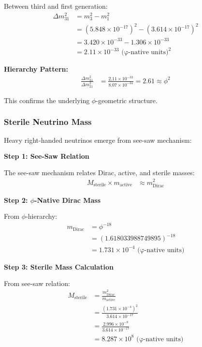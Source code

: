 Between third and first generation:
\begin{align}
\Delta m_{31}^2 &= m_3^2 - m_1^2 \\
&= (5.848 \times 10^{-17})^2 - (3.614 \times 10^{-17})^2 \\
&= 3.420 \times 10^{-33} - 1.306 \times 10^{-33} \\
&= 2.11 \times 10^{-33} \text{ (φ-native units)}^2
\end{align}

\textbf{Hierarchy Pattern:}
\begin{align}
\frac{\Delta m_{31}^2}{\Delta m_{21}^2} &= \frac{2.11 \times 10^{-33}}{8.07 \times 10^{-34}} = 2.61 \approx \phi^2
\end{align}

This confirms the underlying $\phi$-geometric structure.

\subsubsection{Sterile Neutrino Mass}

Heavy right-handed neutrinos emerge from see-saw mechanism:

\textbf{Step 1: See-Saw Relation}

The see-saw mechanism relates Dirac, active, and sterile masses:
\begin{align}
M_{\text{sterile}} \times m_{\text{active}} &\approx m_{\text{Dirac}}^2
\end{align}

\textbf{Step 2: $\phi$-Native Dirac Mass}

From $\phi$-hierarchy:
\begin{align}
m_{\text{Dirac}} &= \phi^{-18} \\
&= (1.618033988749895)^{-18} \\
&= 1.731 \times 10^{-4} \text{ (φ-native units)}
\end{align}

\textbf{Step 3: Sterile Mass Calculation}

From see-saw relation:
\begin{align}
M_{\text{sterile}} &= \frac{m_{\text{Dirac}}^2}{m_{\text{active}}} \\
&= \frac{(1.731 \times 10^{-4})^2}{3.614 \times 10^{-17}} \\
&= \frac{2.996 \times 10^{-8}}{3.614 \times 10^{-17}} \\
&= 8.287 \times 10^{8} \text{ (φ-native units)}
\end{align}

